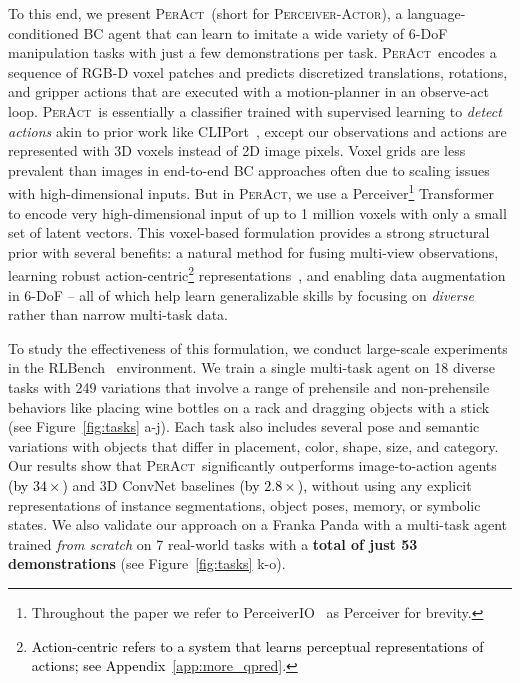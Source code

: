 \documentclass{article}
\newcommand{\appsecref}[1]{Appendix~\ref{#1}}
\newcommand{\figref}[1]{Figure~\ref{#1}}
\newcommand{\highlight}[1]{\textcolor{black}{#1}}
\newcommand{\model}{\textsc{PerAct}}
\newcommand{\modelfullns}{\textsc{Perceiver-Actor}}
\begin{document}
To this end, we present \model~(short for \modelfullns), a language-conditioned BC agent that can learn to imitate a wide variety of 6-DoF manipulation tasks with just a few demonstrations per task. \model~encodes a sequence of RGB-D voxel patches and predicts discretized translations, rotations, and gripper actions that are executed with a motion-planner in an observe-act loop. \model~is essentially a classifier trained with supervised learning to \textit{detect actions} akin to prior work like CLIPort~\citep{cliport,zengTransporterNetworksRearranging2021},
except our observations and actions are represented with 3D voxels instead of 2D image pixels. 
Voxel grids are  less prevalent than images in end-to-end BC approaches often due to scaling issues with high-dimensional inputs. But in \model, we use a Perceiver\footnote{Throughout the paper we refer to PerceiverIO~\citep{jaegle2021perceiver} as Perceiver for brevity.} Transformer~\citep{jaegle2021perceiver} to encode very high-dimensional input of up to 1 million voxels with only a small set of latent vectors. This voxel-based formulation provides a strong structural prior with several benefits: a natural method for fusing multi-view observations, learning robust action-centric\footnote{\highlight{Action-centric refers to a  system that learns perceptual representations of actions; see \appsecref{app:more_qpred}.}} representations~\citep{gibson2014ecological,brooks1991new}, and enabling data augmentation in 6-DoF -- all of which help learn generalizable skills by focusing on \textit{diverse} rather than narrow multi-task data.  

To study the effectiveness of this formulation, we conduct large-scale experiments in the RLBench~\citep{james2020rlbench} environment. We train a single multi-task agent on 18 diverse tasks with 249 variations that involve a range of prehensile and non-prehensile behaviors like placing wine bottles on a rack and dragging objects with a stick (see \figref{fig:tasks} a-j). Each task also includes several pose and semantic variations with objects that differ in placement, color, shape, size, and category. 
Our results show that \model~significantly outperforms image-to-action agents \highlight{(by $34\times$)} and 3D ConvNet baselines \highlight{(by $2.8\times$)}, without using any explicit representations of instance segmentations, object poses, memory, or symbolic states. 
We also validate our approach on a Franka Panda with a multi-task agent trained \textit{from scratch} on 7 real-world tasks  with a \textbf{total of just 53 demonstrations} (see \figref{fig:tasks} k-o).
\end{document}
